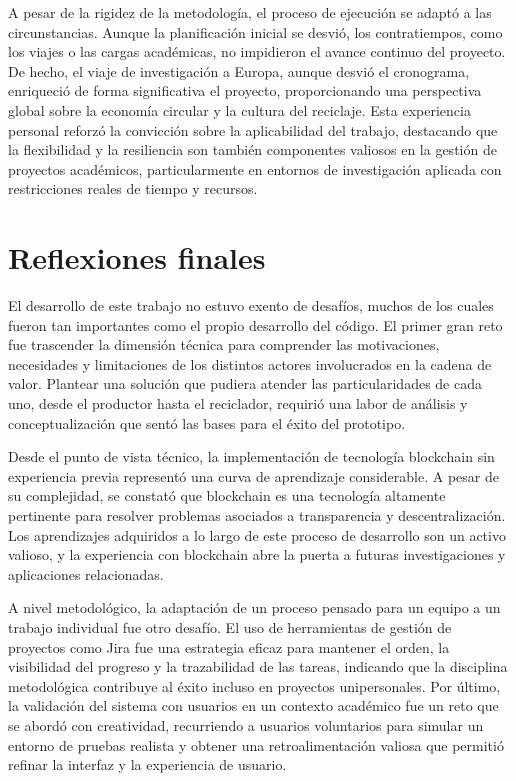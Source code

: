 A pesar de la rigidez de la metodología, el proceso de ejecución se adaptó a las circunstancias. Aunque la planificación inicial se desvió, los contratiempos, como los viajes o las cargas académicas, no impidieron el avance continuo del proyecto. De hecho, el viaje de investigación a Europa, aunque desvió el cronograma, enriqueció de forma significativa el proyecto, proporcionando una perspectiva global sobre la economía circular y la cultura del reciclaje. Esta experiencia personal reforzó la convicción sobre la aplicabilidad del trabajo, destacando que la flexibilidad y la resiliencia son también componentes valiosos en la gestión de proyectos académicos, particularmente en entornos de investigación aplicada con restricciones reales de tiempo y recursos.

\section{Reflexiones finales}

El desarrollo de este trabajo no estuvo exento de desafíos, muchos de los cuales fueron tan importantes como el propio desarrollo del código. El primer gran reto fue trascender la dimensión técnica para comprender las motivaciones, necesidades y limitaciones de los distintos actores involucrados en la cadena de valor. Plantear una solución que pudiera atender las particularidades de cada uno, desde el productor hasta el reciclador, requirió una labor de análisis y conceptualización que sentó las bases para el éxito del prototipo.

Desde el punto de vista técnico, la implementación de tecnología blockchain sin experiencia previa representó una curva de aprendizaje considerable. A pesar de su complejidad, se constató que blockchain es una tecnología altamente pertinente para resolver problemas asociados a transparencia y descentralización. Los aprendizajes adquiridos a lo largo de este proceso de desarrollo son un activo valioso, y la experiencia con blockchain abre la puerta a futuras investigaciones y aplicaciones relacionadas.

A nivel metodológico, la adaptación de un proceso pensado para un equipo a un trabajo individual fue otro desafío. El uso de herramientas de gestión de proyectos como Jira fue una estrategia eficaz para mantener el orden, la visibilidad del progreso y la trazabilidad de las tareas, indicando que la disciplina metodológica contribuye al éxito incluso en proyectos unipersonales. Por último, la validación del sistema con usuarios en un contexto académico fue un reto que se abordó con creatividad, recurriendo a usuarios voluntarios para simular un entorno de pruebas realista y obtener una retroalimentación valiosa que permitió refinar la interfaz y la experiencia de usuario.


